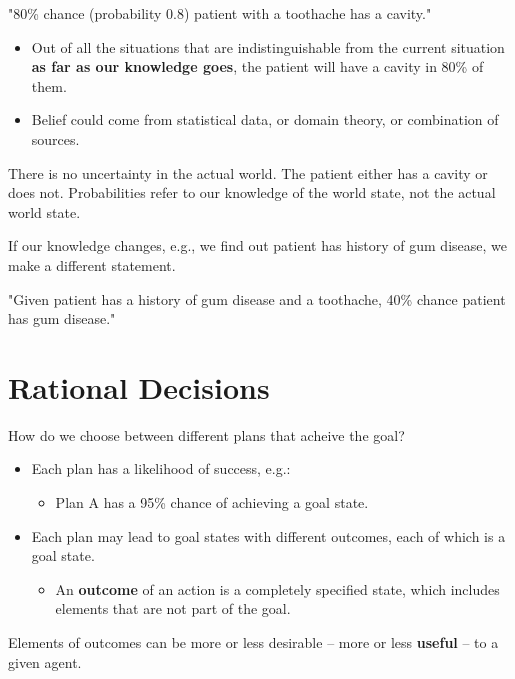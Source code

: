 \documentclass[11pt]{article}
\renewenvironment{quote}{\begin{shaded*}\begin{oldquote}}{\end{oldquote}\end{shaded*}}
\begin{document}
"80\% chance (probability 0.8) patient with a toothache has a cavity."

\begin{itemize}
\item Out of all the situations that are indistinguishable from the current situation \textbf{as far as our knowledge goes}, the patient will have a cavity in 80\% of them.
\item Belief could come from statistical data, or domain theory, or combination of sources.
\end{itemize}

\begin{quote}
There is no uncertainty in the actual world.  The patient either has a cavity or does not. Probabilities refer to our knowledge of the world state, not the actual world state.
\end{quote}

If our knowledge changes, e.g., we find out patient has history of gum disease, we make a different statement.

"Given patient has a history of gum disease and a toothache, 40\% chance patient has gum disease."
\section{Rational Decisions}
\label{sec:org7635440}

How do we choose between different plans that acheive the goal?

\begin{itemize}
\item Each plan has a likelihood of success, e.g.:

\begin{itemize}
\item Plan A has a 95\% chance of achieving a goal state.
\end{itemize}

\item Each plan may lead to goal states with different outcomes, each of which is a goal state.

\begin{itemize}
\item An \textbf{outcome} of an action is a completely specified state, which includes elements that are not part of the goal.
\end{itemize}
\end{itemize}

Elements of outcomes can be more or less desirable -- more or less \textbf{useful} -- to a given agent.
\end{document}
